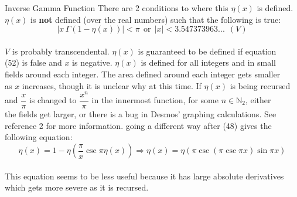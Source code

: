 \documentclass[12pt]{article}
\begin{document}
\begin{section}{Inverse Gamma Function}
	\noindent There are 2 conditions to where this $\eta(x)$ is defined.\\
	$\eta(x)$ is \textbf{not} defined (over the real numbers) such that the following is true:\\
	\begin{equation}
		|x\,\Gamma(1-\eta(x))|<\pi~~\text{or}~~|x|<3.547373963...~~(V)
	\end{equation}\\
	$V$ is probably transcendental. $\eta(x)$ is guaranteed to be defined if equation\\
	(52) is false and $x$ is negative. $\eta(x)$ is defined for all integers and in small\\
	fields around each integer. The area defined around each integer gets smaller\\
	as $x$ increases, though it is unclear why at this time. If $\eta(x)$ is being recursed\\
	and $\dfrac x\pi$ is changed to $\dfrac{x^n}\pi$ in the innermost function, for some $n\in\mathbb N_2$, either\\
	the fields get larger, or there is a bug in Desmos' graphing calculations. See\\
	reference 2 for more information. going a different way after (48) gives the\\
	following equation:\\
	\begin{equation}
		\eta(x)=1-\eta\left(\dfrac\pi x\csc\pi\eta(x)\right)\Longrightarrow\eta(x)=\eta(\pi\csc(\pi\csc\pi x)\sin\pi x)
	\end{equation}\\
	This equation seems to be less useful because it has large absolute derivatives\\
	which gets more severe as it is recursed.
\end{section}
\end{document}
